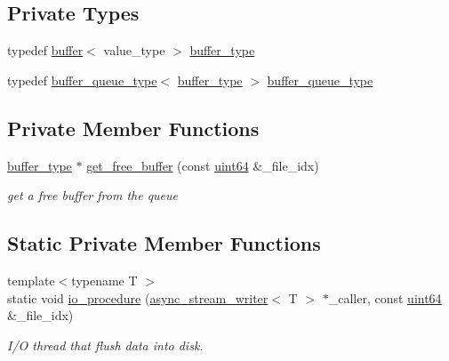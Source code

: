 \subsection*{Private Types}
\begin{DoxyCompactItemize}
\item 
typedef \hyperlink{structbuffer}{buffer}$<$ value\+\_\+type $>$ \hyperlink{classasync__multi__stream__writer_ae11c006e394241a9a5b003a30e8c8c92}{buffer\+\_\+type}
\item 
typedef \hyperlink{classasync__multi__stream__writer_a1ac00be81314a643563a45cafe6f8660}{buffer\+\_\+queue\+\_\+type}$<$ \hyperlink{classasync__multi__stream__writer_ae11c006e394241a9a5b003a30e8c8c92}{buffer\+\_\+type} $>$ \hyperlink{classasync__multi__stream__writer_a1ac00be81314a643563a45cafe6f8660}{buffer\+\_\+queue\+\_\+type}
\end{DoxyCompactItemize}
\subsection*{Private Member Functions}
\begin{DoxyCompactItemize}
\item 
\hyperlink{classasync__multi__stream__writer_ae11c006e394241a9a5b003a30e8c8c92}{buffer\+\_\+type} $\ast$ \hyperlink{classasync__multi__stream__writer_a2598da84bf94a7576d3910e8fc16a18d}{get\+\_\+free\+\_\+buffer} (const \hyperlink{types_8h_a60e8696a4678cd348e991a1f172e53f7}{uint64} \&\+\_\+file\+\_\+idx)
\begin{DoxyCompactList}\small\item\em get a free buffer from the queue \end{DoxyCompactList}\end{DoxyCompactItemize}
\subsection*{Static Private Member Functions}
\begin{DoxyCompactItemize}
\item 
{\footnotesize template$<$typename T $>$ }\\static void \hyperlink{classasync__multi__stream__writer_ae0df727c7d673954c263e5b589a8f0c7}{io\+\_\+procedure} (\hyperlink{classasync__stream__writer}{async\+\_\+stream\+\_\+writer}$<$ T $>$ $\ast$\+\_\+caller, const \hyperlink{types_8h_a60e8696a4678cd348e991a1f172e53f7}{uint64} \&\+\_\+file\+\_\+idx)
\begin{DoxyCompactList}\small\item\em I/O thread that flush data into disk. \end{DoxyCompactList}\end{DoxyCompactItemize}

